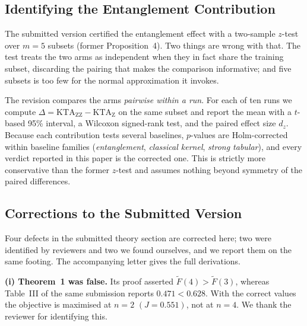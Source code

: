 \subsection{Identifying the Entanglement Contribution}

The submitted version certified the entanglement effect with a two-sample
$z$-test over $m=5$ subsets (former Proposition~4). Two things are wrong with
that. The test treats the two arms as independent when they in fact share the
training subset, discarding the pairing that makes the comparison informative;
and five subsets is too few for the normal approximation it invokes.

The revision compares the arms \emph{pairwise within a run}. For each of ten runs
we compute
$\Delta = \mathrm{KTA}_{\mathrm{ZZ}} - \mathrm{KTA}_{\mathrm{Z}}$ on the same
subset and report the mean with a $t$-based 95\% interval, a Wilcoxon
signed-rank test, and the paired effect size $d_z$. Because each contribution
tests several baselines, $p$-values are Holm-corrected within baseline families
(\emph{entanglement}, \emph{classical kernel}, \emph{strong tabular}), and every
verdict reported in this paper is the corrected one. This is strictly more
conservative than the former $z$-test and assumes nothing beyond symmetry of the
paired differences.

\subsection{Corrections to the Submitted Version}
\label{sec:erratum}

Four defects in the submitted theory section are corrected here; two were
identified by reviewers and two we found ourselves, and we report them on the
same footing. The accompanying letter gives the full derivations.

\textbf{(i) Theorem~1 was false.} Its proof asserted
$\widetilde{F}(4) > \widetilde{F}(3)$, whereas Table~III of the same submission
reports $0.471 < 0.628$. With the correct values the objective is maximised at
$n=2$ $(J=0.551)$, not at $n=4$. We thank the reviewer for identifying this.

